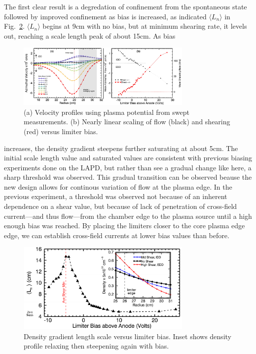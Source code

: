 \documentclass[%
 aps,
 prl,
 amsmath,amssymb,
 reprint,%
]{revtex4-1}
\begin{document}
The first clear result is a degredation of confinement from the spontaneous state followed by improved confinement as bias is increased, as indicated  $\langle L_{n}\rangle$ in Fig.~\ref{fig:densgrad}. $\langle L_{n}\rangle$ begins at 9cm with no bias, but at minimum shearing rate, it levels out, reaching a scale length peak of about 15cm. As bias
\begin{figure}
\begin{center}
\includegraphics[width=8.5cm]{velocity_flowshear.pdf}%
\caption{\label{fig:velocity_flowshear} (a) Velocity profiles using plasma potential from swept measurements. (b) Nearly linear scaling of flow (black) and shearing (red) versus limiter bias.}
\end{center}
\end{figure}
increases, the density gradient steepens further saturating at about 5cm. The initial scale length value and saturated values are consistent with previous biasing experiments done on the LAPD\cite{carter09}, but rather than see a gradual change like here, a sharp threshold was observed. This gradual transition can be observed beause the new design allows for continous variation of flow at the plasma edge. In the previous experiment, a threshold was observed not because of an inherent dependence on a shear value, but because of lack of penetration of cross-field current---and thus flow---from the chamber edge to the plasma source until a high enough bias was reached. By placing the limiters closer to the core plasma edge edge, we can establish cross-field currents at lower bias values than before.

\begin{figure}
\begin{center}
\includegraphics[width=8.5cm]{densgrad.pdf}%
\caption{\label{fig:densgrad} Density gradient length scale versus limiter bias. Inset shows density profile relaxing then steepening again with bias.}
\end{center}
\end{figure}
\end{document}
